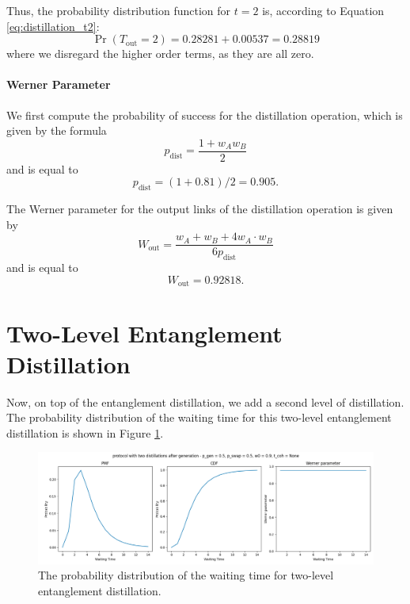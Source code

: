 \documentclass{masterthesis}
\begin{document}
Thus, the probability distribution function for $t = 2$ is, according to Equation \ref{eq:distillation_t2}:
\begin{equation}
    \Pr(T_{\text{out}} = 2) = 0.28281 + 0.00537 = 0.28819
\end{equation}
where we disregard the higher order terms, as they are all zero.

\paragraph*{Werner Parameter}

We first compute the probability of success for the distillation operation, which is given by the formula
\begin{equation}
    p_{\text{dist}} = \frac{1 + w_A w_B}{2}
\end{equation}
and is equal to
\begin{equation}
    p_{\text{dist}} = (1 + 0.81) / 2 = 0.905 .
\end{equation}

The Werner parameter for the output links of the distillation operation is given by
\begin{equation}
    W_{\text{out}} = \frac{w_A + w_B + 4 w_A \cdot w_B}{6 p_{\text{dist}}}
\end{equation}
and is equal to
\begin{equation}
    W_{\text{out}} = 0.92818 .
\end{equation}

\section*{Two-Level Entanglement Distillation}

Now, on top of the entanglement distillation, we add a second level of distillation. The probability distribution of the waiting time for this two-level entanglement distillation is shown in Figure \ref{fig:two_level_distillation_waiting_time}.

\begin{figure}[ht]
    \centering
    \includegraphics[width=1\linewidth]{images/dist_tests/two distillations after generation.png}
    \caption{The probability distribution of the waiting time for two-level entanglement distillation.}
    \label{fig:two_level_distillation_waiting_time}
\end{figure}
\end{document}
